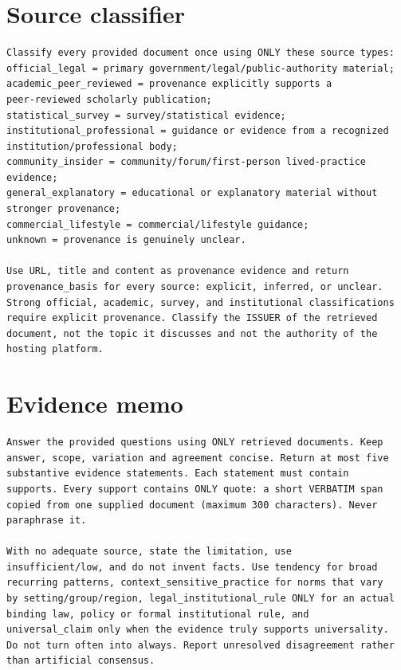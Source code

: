 \section*{Source classifier}

\begin{lstlisting}
Classify every provided document once using ONLY these source types:
official_legal = primary government/legal/public-authority material;
academic_peer_reviewed = provenance explicitly supports a
peer-reviewed scholarly publication;
statistical_survey = survey/statistical evidence;
institutional_professional = guidance or evidence from a recognized
institution/professional body;
community_insider = community/forum/first-person lived-practice
evidence;
general_explanatory = educational or explanatory material without
stronger provenance;
commercial_lifestyle = commercial/lifestyle guidance;
unknown = provenance is genuinely unclear.

Use URL, title and content as provenance evidence and return
provenance_basis for every source: explicit, inferred, or unclear.
Strong official, academic, survey, and institutional classifications
require explicit provenance. Classify the ISSUER of the retrieved
document, not the topic it discusses and not the authority of the
hosting platform.
\end{lstlisting}

\section*{Evidence memo}

\begin{lstlisting}
Answer the provided questions using ONLY retrieved documents. Keep
answer, scope, variation and agreement concise. Return at most five
substantive evidence statements. Each statement must contain
supports. Every support contains ONLY quote: a short VERBATIM span
copied from one supplied document (maximum 300 characters). Never
paraphrase it.

With no adequate source, state the limitation, use
insufficient/low, and do not invent facts. Use tendency for broad
recurring patterns, context_sensitive_practice for norms that vary
by setting/group/region, legal_institutional_rule ONLY for an actual
binding law, policy or formal institutional rule, and
universal_claim only when the evidence truly supports universality.
Do not turn often into always. Report unresolved disagreement rather
than artificial consensus.
\end{lstlisting}

